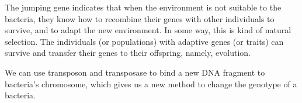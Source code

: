 \documentclass{article}
\begin{document}
		The jumping gene indicates that when the environment is not suitable to the bacteria, they know how to recombine their genes with other individuals to survive, and to adapt the new environment. In some way, this is kind of natural selection. The individuals (or populations) with adaptive genes (or traits) can survive and transfer their genes to their offspring, namely, evolution.

		We can use transposon and transposase to bind a new DNA fragment to bacteria's chromosome, which gives us a new method to change the genotype of a bacteria. 
\end{document}
